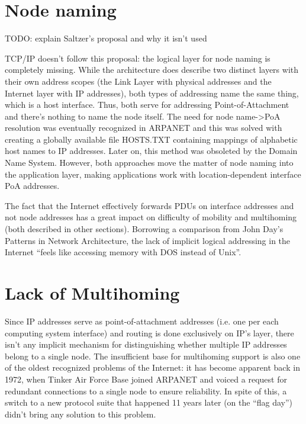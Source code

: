     \section{Node naming}

        TODO: explain Saltzer's proposal and why it isn't used

        TCP/IP doesn't follow this proposal: the logical layer for node naming is completely missing. While the architecture does describe two distinct layers with their own address scopes (the Link Layer with physical addresses and the Internet layer with IP addresses), both types of addressing name the same thing, which is a host interface. Thus, both serve for addressing Point-of-Attachment and there's nothing to name the node itself. The need for node name->PoA resolution was eventually recognized in ARPANET and this was solved with creating a globally available file HOSTS.TXT containing mappings of alphabetic host names to IP addresses. Later on, this method was obsoleted by the Domain Name System. However, both approaches move the matter of node naming into the application layer, making applications work with location-dependent interface PoA addresses.

        The fact that the Internet effectively forwards PDUs on interface addresses and not node addresses has a great impact on difficulty of mobility and multihoming (both described in other sections). Borrowing a comparison from John Day's Patterns in Network Architecture, the lack of implicit logical addressing in the Internet ``feels like accessing memory with DOS instead of Unix''.

    \section{Lack of Multihoming}

        Since IP addresses serve as point-of-attachment addresses (i.e. one per each computing system interface) and routing is done exclusively on IP's layer, there isn't any implicit mechanism for distinguishing whether multiple IP addresses belong to a single node. The insufficient base for multihoming support is also one of the oldest recognized problems of the Internet: it has become apparent back in 1972, when Tinker Air Force Base joined ARPANET and voiced a request for redundant connections to a single node to ensure reliability. In spite of this, a switch to a new protocol suite that happened 11 years later (on the ``flag day'') didn't bring any solution to this problem.

